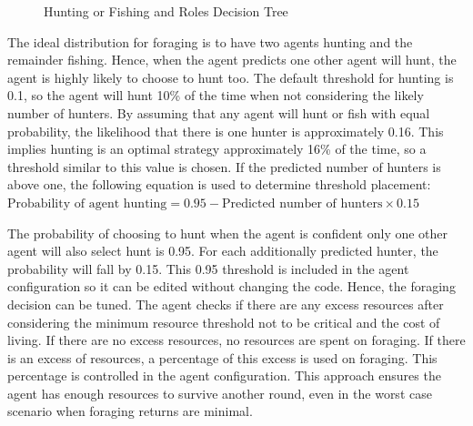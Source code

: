\begin{figure}[!htb]
    \centering
    \caption{Hunting or Fishing and Roles Decision Tree}
\end{figure}



The ideal distribution for foraging is to have two agents hunting and the remainder fishing. Hence, when the agent predicts one other agent will hunt, the agent is highly likely to choose to hunt too. The default threshold for hunting is 0.1, so the agent will hunt 10\% of the time when not considering the likely number of hunters. By assuming that any agent will hunt or fish with equal probability, the likelihood that there is one hunter is approximately 0.16. This implies hunting is an optimal strategy approximately 16\% of the time, so a threshold similar to this value is chosen. If the predicted number of hunters is above one, the following equation is used to determine threshold placement: $\text{Probability of agent hunting} = 0.95 - \text{Predicted number of hunters} \times 0.15$

The probability of choosing to hunt when the agent is confident only one other agent will also select hunt is 0.95. For each additionally predicted hunter, the probability will fall by 0.15. This 0.95 threshold is included in the agent configuration so it can be edited without changing the code. Hence, the foraging decision can be tuned. The agent checks if there are any excess resources after considering the minimum resource threshold not to be critical and the cost of living. If there are no excess resources, no resources are spent on foraging. If there is an excess of resources, a percentage of this excess is used on foraging. This percentage is controlled in the agent configuration. This approach ensures the agent has enough resources to survive another round, even in the worst case scenario when foraging returns are minimal.


